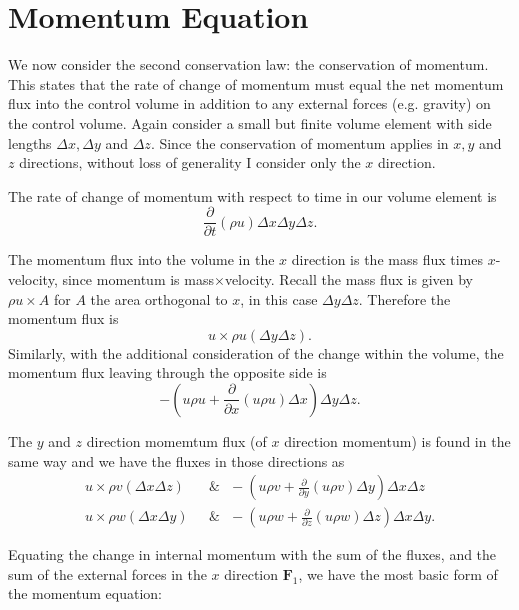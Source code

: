 \documentclass[12pt]{report}
\begin{document}
\section{Momentum Equation}

We now consider the second conservation law: the conservation of momentum.
This states that the rate of change of momentum must equal the net momentum flux into the control volume in addition to any external forces (e.g. gravity) on the control volume.
Again consider a small but finite volume element with side lengths $\Delta x, \Delta y$ and $\Delta z$.
Since the conservation of momentum applies in $x,y$ and $z$ directions, without loss of generality I consider only the $x$ direction.

The rate of change of momentum with respect to time in our volume element is
\begin{equation*} \frac{\partial }{\partial t} \left ( \rho u \right) \Delta x \Delta y \Delta z .\end{equation*}

The momentum flux into the volume in the $x$ direction is the mass flux times $x$-velocity, since momentum is mass$\times$velocity.
Recall the mass flux is given by $\rho u \times A$ for $A$ the area orthogonal to $x$, in this case $\Delta y \Delta z$.
Therefore the momentum flux is
\begin{equation*} u \times \rho u (\Delta y \Delta z) .\end{equation*}
Similarly, with the additional consideration of the change within the volume, the momentum flux leaving through the opposite side is
\begin{equation*} - \left ( u\rho u + \frac{\partial}{\partial x} \left( u\rho u\right ) \Delta x \right ) \Delta y \Delta z .\end{equation*}

The $y$ and $z$ direction momemtum flux (of $x$ direction momentum) is found in the same way and we have the fluxes in those directions as
\begin{align*} u \times \rho v (\Delta x \Delta z) & ~~~\& ~~~ - \left ( u\rho v + \frac{\partial}{\partial y} \left( u\rho v\right ) \Delta y \right ) \Delta x \Delta z \\
u \times \rho w (\Delta x \Delta y) & ~~~\& ~~~ - \left ( u\rho w + \frac{\partial}{\partial z} \left( u\rho w\right ) \Delta z \right ) \Delta x \Delta y . \end{align*}

Equating the change in internal momentum with the sum of the fluxes, and the sum of the external forces in the $x$ direction $\mathbf{F}_1$, we have the most basic form of the momentum equation:
\end{document}
